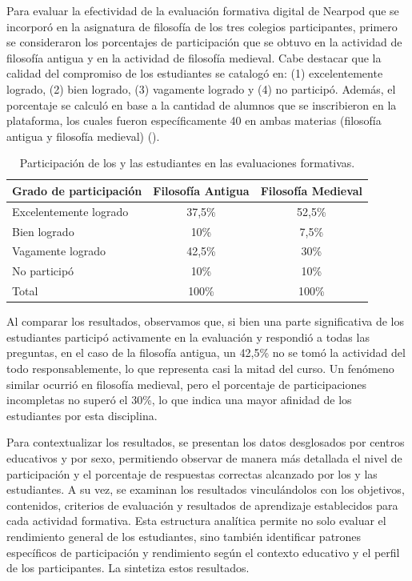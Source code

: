 \documentclass[spanish]{textolivre}
\begin{document}
Para evaluar la efectividad de la evaluación formativa digital de Nearpod que se incorporó en la asignatura de filosofía de los tres colegios participantes, primero se consideraron los porcentajes de participación que se obtuvo en la actividad de filosofía antigua y en la actividad de filosofía medieval. Cabe destacar que la calidad del compromiso de los estudiantes se catalogó en: (1) excelentemente logrado, (2) bien logrado, (3) vagamente logrado y (4) no participó. Además, el porcentaje se calculó en base a la cantidad de alumnos que se inscribieron en la plataforma, los cuales fueron específicamente 40 en ambas materias (filosofía antigua y filosofía medieval) ().

\begin{table}[h!]
\centering
\begin{threeparttable}
\caption{Participación de los y las estudiantes en las evaluaciones formativas.}\label{tab-5}
\begin{tabular}{lcc}
\toprule
Grado de participación & Filosofía Antigua & Filosofía Medieval \\
\midrule
Excelentemente logrado & 37{,}5\% & 52{,}5\% \\
Bien logrado & 10\% & 7{,}5\% \\
Vagamente logrado & 42{,}5\% & 30\% \\
No participó & 10\% & 10\% \\
Total & 100\% & 100\% \\
\bottomrule
\end{tabular}
\end{threeparttable}
\end{table}

Al comparar los resultados, observamos que, si bien una parte significativa de los estudiantes participó activamente en la evaluación y respondió a todas las preguntas, en el caso de la filosofía antigua, un 42,5\% no se tomó la actividad del todo responsablemente, lo que representa casi la mitad del curso. Un fenómeno similar ocurrió en filosofía medieval, pero el porcentaje de participaciones incompletas no superó el 30\%, lo que indica una mayor afinidad de los estudiantes por esta disciplina.

Para contextualizar los resultados, se presentan los datos desglosados por centros educativos y por sexo, permitiendo observar de manera más detallada el nivel de participación y el porcentaje de respuestas correctas alcanzado por los y las estudiantes. A su vez, se examinan los resultados vinculándolos con los objetivos, contenidos, criterios de evaluación y resultados de aprendizaje establecidos para cada actividad formativa. Esta estructura analítica permite no solo evaluar el rendimiento general de los estudiantes, sino también identificar patrones específicos de participación y rendimiento según el contexto educativo y el perfil de los participantes. La  sintetiza estos resultados.
\end{document}
